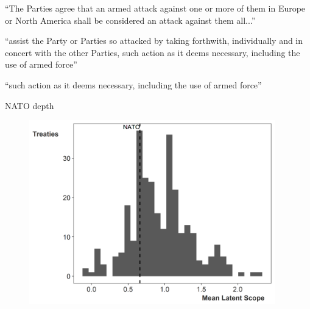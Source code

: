 \documentclass[12pt]{beamer}
\begin{document}

\begin{frame}[standout]

\large ``The Parties agree that an armed attack against one or more of them in Europe or North America shall be considered an attack against them all...'' 

 \end{frame}


\begin{frame}[standout]

\large ``assist the Party or Parties so attacked by taking forthwith, individually and in concert with the other Parties, such action as it deems necessary, including the use of armed force'' 

 \end{frame}


\begin{frame}[standout]

\huge ``such action as it deems necessary, including the use of armed force'' 

 \end{frame}


\begin{frame}{NATO depth} 

\begin{figure}
	\centering
		\includegraphics[width=0.95\textwidth]{ls-hist-nato.png}
\end{figure}


 \end{frame}
\end{document}

